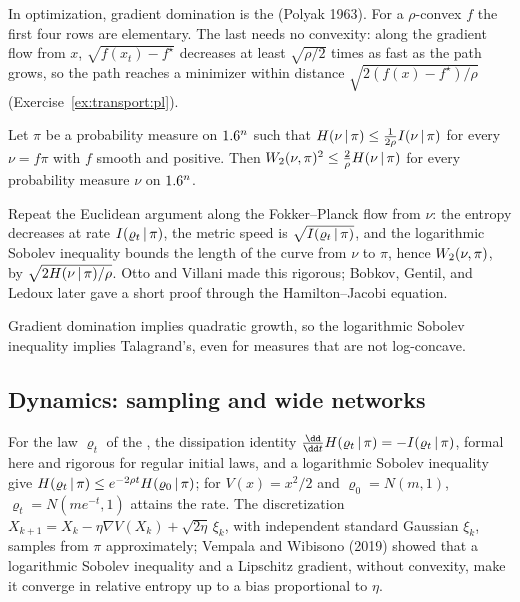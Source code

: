 \begin{refsection}
In optimization, gradient domination is the  (Polyak 1963). For a $\rho$-convex $f$ the first four rows are elementary. The last needs no convexity: along the gradient flow from $x$, $\sqrt{f(x_t)-f^\star}$ decreases at least $\sqrt{\rho/2}$ times as fast as the path grows, so the path reaches a minimizer within distance $\sqrt{2(f(x)-f^\star)/\rho}$ (Exercise~\ref{ex:transport:pl}).

\begin{theorem}\label{thm:transport:ottovillani}
Let $\pi$ be a probability measure on $1.6^n$ such that $H(\nu\,|\,\pi)\le\frac{1}{2\rho}I(\nu\,|\,\pi)$ for every $\nu=f\pi$ with $f$ smooth and positive. Then $W_2(\nu,\pi)^2\le\frac{2}{\rho}H(\nu\,|\,\pi)$ for every probability measure $\nu$ on $1.6^n$.
\end{theorem}

\begin{proofsketch}
Repeat the Euclidean argument along the Fokker--Planck flow from $\nu$: the entropy decreases at rate $I(\varrho_t\,|\,\pi)$, the metric speed is $\sqrt{I(\varrho_t\,|\,\pi)}$, and the logarithmic Sobolev inequality bounds the length of the curve from $\nu$ to $\pi$, hence $W_2(\nu,\pi)$, by $\sqrt{2H(\nu\,|\,\pi)/\rho}$. Otto and Villani made this rigorous; Bobkov, Gentil, and Ledoux later gave a short proof through the Hamilton--Jacobi equation.
\end{proofsketch}

Gradient domination implies quadratic growth, so the logarithmic Sobolev inequality implies Talagrand's, even for measures that are not log-concave.

\subsection{Dynamics: sampling and wide networks}\label{sec:transport:dynamics}

For the law $\varrho_t$ of the , the dissipation identity $\frac{\dd}{\dd t}\transportH{\varrho_t}{\pi}=-\transportI{\varrho_t}{\pi}$, formal here and rigorous for regular initial laws, and a logarithmic Sobolev inequality give $H(\varrho_t\,|\,\pi)\le e^{-2\rho t}H(\varrho_0\,|\,\pi)$; for $V(x)=x^2/2$ and $\varrho_0=N(m,1)$, $\varrho_t=N(me^{-t},1)$ attains the rate. The discretization $X_{k+1}=X_k-\eta\nabla V(X_k)+\sqrt{2\eta}\,\xi_k$, with independent standard Gaussian $\xi_k$, samples from $\pi$ approximately; Vempala and Wibisono (2019) showed that a logarithmic Sobolev inequality and a Lipschitz gradient, without convexity, make it converge in relative entropy up to a bias proportional to $\eta$.


\end{refsection}
